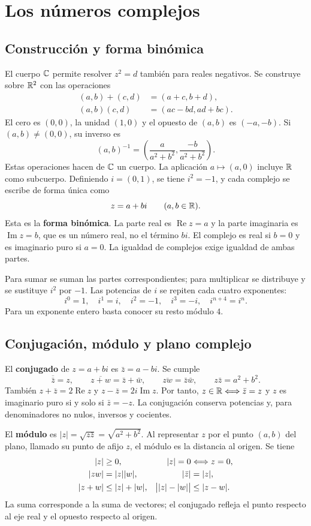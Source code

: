 \chapter{Los números complejos}
\label{cap:complejos}

\section{Construcción y forma binómica}
\label{sec:complejos-binomica}
El cuerpo $\mathbb{C}$ permite resolver $z^2=d$ también para reales negativos.
Se construye sobre $\mathbb{R}^2$ con las operaciones
\begin{align*}
 (a,b)+(c,d)&=(a+c,b+d),\\
 (a,b)(c,d)&=(ac-bd,ad+bc).
\end{align*}
El cero es $(0,0)$, la unidad $(1,0)$ y el opuesto de $(a,b)$ es
$(-a,-b)$. Si $(a,b)\ne(0,0)$, su inverso es
\[
 (a,b)^{-1}=\left(\frac a{a^2+b^2},\frac{-b}{a^2+b^2}\right).
\]
Estas operaciones hacen de $\mathbb{C}$ un cuerpo. La aplicación
$a\mapsto(a,0)$ incluye $\mathbb{R}$ como subcuerpo. Definiendo $i=(0,1)$,
se tiene $i^2=-1$, y cada complejo se escribe de forma única como
\[
 z=a+bi\qquad(a,b\in\mathbb{R}).
\]
Esta es la \textbf{forma binómica}. La parte real es $\operatorname{Re}z=a$
y la parte imaginaria es $\operatorname{Im}z=b$, que es un número real,
no el término $bi$. El complejo es real si $b=0$ y es imaginario puro
si $a=0$. La igualdad de complejos exige igualdad de ambas partes.

Para sumar se suman las partes correspondientes; para multiplicar se
distribuye y se sustituye $i^2$ por $-1$.
Las potencias de $i$ se repiten cada cuatro exponentes:
\[
 i^0=1,\quad i^1=i,\quad i^2=-1,\quad i^3=-i,\quad i^{n+4}=i^n.
\]
Para un exponente entero basta conocer su resto módulo $4$.

\section{Conjugación, módulo y plano complejo}
\label{sec:conjugacion-modulo}
El \textbf{conjugado} de $z=a+bi$ es $\bar z=a-bi$. Se cumple
\[
 \overline{\bar z}=z,\qquad
 \overline{z+w}=\bar z+\bar w,\qquad
 \overline{zw}=\bar z\bar w,
 \qquad z\bar z=a^2+b^2.
\]
También $z+\bar z=2\operatorname{Re}z$ y
$z-\bar z=2i\operatorname{Im}z$. Por tanto,
$z\in\mathbb{R}\Longleftrightarrow\bar z=z$ y $z$ es imaginario puro si y solo si
$\bar z=-z$. La conjugación conserva potencias y, para denominadores
no nulos, inversos y cocientes.

El \textbf{módulo} es $|z|=\sqrt{z\bar z}=\sqrt{a^2+b^2}$.
Al representar $z$ por el punto $(a,b)$ del plano, llamado su punto
de afijo $z$, el módulo es la distancia al origen. Se tiene
\begin{align*}
 |z|&\ge0,& |z|=0&\Longleftrightarrow z=0,\\
 |zw|&=|z||w|,&|\bar z|&=|z|,\\
 |z+w|&\le|z|+|w|,&\bigl||z|-|w|\bigr|&\le|z-w|.
\end{align*}
La suma corresponde a la suma de vectores; el conjugado refleja el punto
respecto al eje real y el opuesto respecto al origen.

